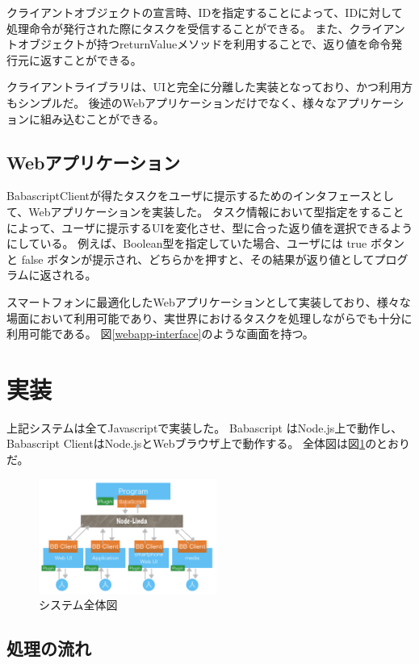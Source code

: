 クライアントオブジェクトの宣言時、IDを指定することによって、IDに対して処理命令が発行された際にタスクを受信することができる。
また、クライアントオブジェクトが持つreturnValueメソッドを利用することで、返り値を命令発行元に返すことができる。

クライアントライブラリは、UIと完全に分離した実装となっており、かつ利用方もシンプルだ。
後述のWebアプリケーションだけでなく、様々なアプリケーションに組み込むことができる。

\subsection{Webアプリケーション}\label{webux30a2ux30d7ux30eaux30b1ux30fcux30b7ux30e7ux30f3}

BabascriptClientが得たタスクをユーザに提示するためのインタフェースとして、Webアプリケーションを実装した。
タスク情報において型指定をすることによって、ユーザに提示するUIを変化させ、型に合った返り値を選択できるようにしている。
例えば、Boolean型を指定していた場合、ユーザには true ボタンと false
ボタンが提示され、どちらかを押すと、その結果が返り値としてプログラムに返される。

スマートフォンに最適化したWebアプリケーションとして実装しており、様々な場面において利用可能であり、実世界におけるタスクを処理しながらでも十分に利用可能である。
図\ref{webapp-interface}のような画面を持つ。

\section{実装}\label{ux5b9fux88c5}

上記システムは全てJavascriptで実装した。 Babascript
はNode.js上で動作し、 Babascript
ClientはNode.jsとWebブラウザ上で動作する。
全体図は図\ref{system}のとおりだ。

\begin{figure}[h]
  \includegraphics[width=220px]{./images/system.png}
  \caption{システム全体図}  
  \label{system}
\end{figure}

\subsection{処理の流れ}\label{ux51e6ux7406ux306eux6d41ux308c}

